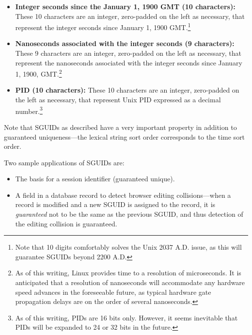 \begin{itemize}
\item \textbf{Integer seconds since the January 1, 1900 GMT (10 characters):}
      These 10 characters are an integer, zero-padded on the left as
      necessary, that represent the integer seconds since January 1, 1900
      GMT.\footnote{Note that 10 digits comfortably solves the Unix
      2037 A.D. issue, as this will guarantee SGUIDs 
      beyond 2200 A.D.}
\item \textbf{Nanoseconds associated with the integer seconds (9 characters):}
      These 9 characters are an integer, zero-padded on the left as
      necessary, that represent the nanoseconds associated with the
      integer seconds since January 1, 1900,
      GMT.\footnote{As of this writing, Linux provides time to a resolution
      of microseconds.  It is anticipated that a resolution of nanoseconds will
      accommodate any hardware speed advances in the foreseeable future, as typical
      hardware gate propagation delays are on the order of several nanoseconds.}  
\item \textbf{PID (10 characters):}
      These 10 characters are an integer, zero-padded on the left as
      necessary, that represent Unix PID expressed 
      as a decimal number.\footnote{As of this writing, PIDs are 16 bits only.
      However, it seems inevitable that PIDs will be expanded to 24 or 32 bits in the 
      future.}  
\end{itemize}

Note that SGUIDs as described have a very important property in addition to
guaranteed uniqueness---the lexical
string sort order corresponds to the time sort order.

Two sample applications of SGUIDs are:

\begin{itemize}
\item The basis for a session identifier (guaranteed unique).
\item A field in a database record to detect browser editing collisions---when a record
      is modified and a new SGUID is assigned to the record, it is \emph{guaranteed}
      not to be the same as the previous SGUID, and thus detection of the editing collision
      is guaranteed.
\end{itemize}


